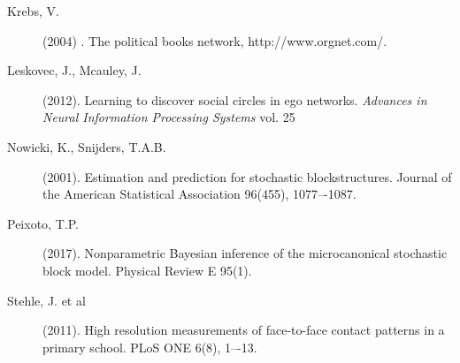 
\begin{description}

	

	
	\item[Krebs, V.] (2004) . The political books network,
	http://www.orgnet.com/.

	\item[Leskovec, J., Mcauley, J.] (2012).
	Learning to discover social circles in ego networks.
	{\it Advances in Neural Information Processing Systems} vol. 25

	\item[Nowicki, K., Snijders, T.A.B.] (2001).
	Estimation and prediction for stochastic blockstructures. 
	Journal of the American Statistical Association 96(455), 1077–-1087.

	

	\item[Peixoto, T.P.] (2017).
	Nonparametric Bayesian inference of the microcanonical
	stochastic block model. Physical Review E 95(1).


	\item[Stehle, J. et al] (2011).
	High resolution measurements of face-to-face contact patterns in a primary school.
	PLoS ONE 6(8), 1–-13.

\end{description}